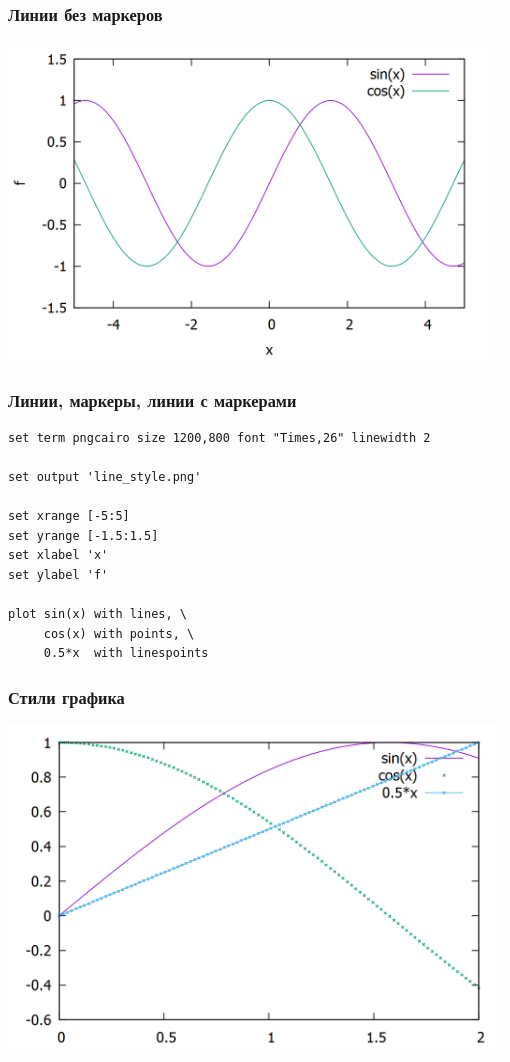 \documentclass[12pt, compress]{beamer}
\begin{document}
\begin{frame}[c,fragile]
\frametitle{Линии без маркеров}
\includegraphics[width=0.95\textwidth]{./gp/functions2.png}
\end{frame}


\begin{frame}[c,fragile]
\frametitle{Линии, маркеры, линии с маркерами}
\begin{lstlisting}
set term pngcairo size 1200,800 font "Times,26" linewidth 2

set output 'line_style.png'

set xrange [-5:5]
set yrange [-1.5:1.5]
set xlabel 'x'
set ylabel 'f'

plot sin(x) with lines, \
     cos(x) with points, \
     0.5*x  with linespoints
\end{lstlisting}
\end{frame}

\begin{frame}[t]
\frametitle{Стили графика}
\includegraphics[width=0.98\textwidth]{./gp/line_style.png}
\end{frame}
\end{document}
